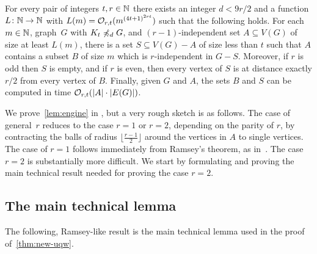 \begin{lemma}\label{lem:engine}
For every pair of integers $t,r\in \mathbb{N}$ there exists an integer $d<9r/2$ and a function $L\colon \mathbb{N}\to \mathbb{N}$ with $L(m)=\mathcal{O}_{r,t}{(m^{{(4t+1)}^{2rt}})}$ such that the following holds.
For each $m\in \mathbb{N}$, graph~$G$ with $K_t\not\preccurlyeq_{d} G$, and
$(r-1)$-independent set $A\subseteq V(G)$ of size at least $L(m)$, there is a set $S\subseteq V(G)-A$ of size less than $t$ such that $A$ contains a subset $B$ of size $m$ which is $r$-independent in $G-S$.
Moreover, if $r$ is odd then $S$ is empty, and if $r$ is even,
then every vertex of $S$ is at distance exactly $r/2$ from every vertex of $B$.
Finally, given $G$ and $A$, the sets $B$ and $S$ can be computed in time $\mathcal{O}_{r,t}(|A|\cdot |E(G)|)$.
\end{lemma}

We prove~\cref{lem:engine} in , but  a very rough sketch is as follows.
The  case of general~$r$ reduces to the case $r=1$ or $r=2$, depending on the parity of $r$,
by contracting the balls of radius $\lfloor \frac {r-1} 2\rfloor $ around the vertices in $A$ to single vertices.
The case of $r=1$ follows immediately from Ramsey's theorem, as in~\cite{nevsetvril2011nowhere}.
The case $r=2$ is substantially more difficult.
We start by formulating and proving the main technical result needed for proving the case $r=2$.







\subsection{The main technical lemma}
\label{sec:main-tech}

The following, Ramsey-like result is the main technical lemma used in the proof of~\cref{thm:new-uqw}. 

\pagebreak


